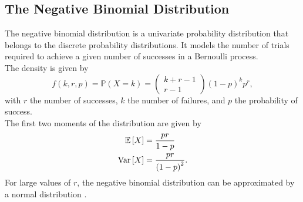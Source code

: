 \subsection{The Negative Binomial Distribution}
The negative binomial distribution is a univariate probability distribution that belongs to the discrete probability distributions. It models the number of trials required to achieve a given number of successes in a Bernoulli process. \\
The density is given by
\begin{equation}
    f\left(k,r,p\right)=\mathbb{P}\left(X=k\right)=\begin{pmatrix} k+r-1\\r-1\end{pmatrix}\left(1-p\right)^kp^r,
\end{equation}
with $r$ the number of successes, $k$ the number of failures, and $p$ the probability of success. \\
The first two moments of the distribution are given by
\begin{align}
    \mathbb{E}\left[X\right] &= \frac{pr}{1-p} \\
    \hbox{Var}\left[X\right] &= \frac{pr}{\left(1-p\right)^2}.
\end{align} 
For large values of $r$, the negative binomial distribution can be approximated by a normal distribution
\autocite[][]{haldane1941fitting}.
\clearpage
